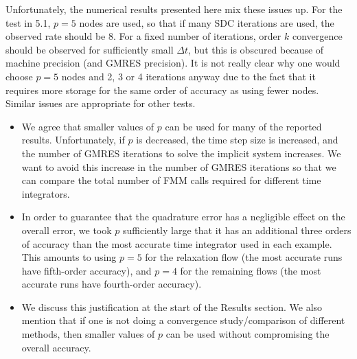 \documentclass[12pt]{article}
\newcommand{\comment}[1]{{\color{blue} #1}}
\begin{document}
\comment{Unfortunately, the numerical results presented here mix these
issues up.  For the test in 5.1, $p=5$ nodes are used, so that if many
SDC iterations are used, the observed rate should be 8. For a fixed
number of iterations, order $k$ convergence should be observed for
sufficiently small $\Delta t$, but this is obscured because of machine
precision (and GMRES precision). It is not really clear why one would
choose $p=5$ nodes and 2, 3 or 4 iterations anyway due to the fact that
it requires more storage for the same order of accuracy as using fewer
nodes. Similar issues are appropriate for other tests.}
\begin{itemize}
  \item We agree that smaller values of $p$ can be used for many of the
  reported results.  Unfortunately, if $p$ is decreased, the time step
  size is increased, and the number of GMRES iterations to solve the
  implicit system increases.  We want to avoid this increase in the
  number of GMRES iterations so that we can compare the total number of
  FMM calls required for different time integrators.
  \item In order to guarantee that the quadrature error has a
  negligible effect on the overall error, we took $p$ sufficiently
  large that it has an additional three orders of accuracy than the
  most accurate time integrator used in each example.  This amounts to
  using $p=5$ for the relaxation flow (the most accurate runs have
  fifth-order accuracy), and $p=4$ for the remaining flows (the most
  accurate runs have fourth-order accuracy).
  \item We discuss this justification at the start of the Results
  section.  We also mention that if one is not doing a convergence
  study/comparison of different methods, then smaller values of $p$
  can be used without compromising the overall accuracy.
\end{itemize}
\end{document}
